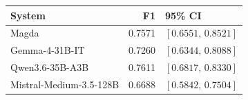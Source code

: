 \begin{tabular}{@{}lrl@{}}
\toprule
System & F1 & 95\% CI \\
\midrule
Magda & 0.7571 & $[0.6551,\,0.8521]$ \\
Gemma-4-31B-IT & 0.7260 & $[0.6344,\,0.8088]$ \\
Qwen3.6-35B-A3B & 0.7611 & $[0.6817,\,0.8330]$ \\
Mistral-Medium-3.5-128B & 0.6688 & $[0.5842,\,0.7504]$ \\
\bottomrule
\end{tabular}
